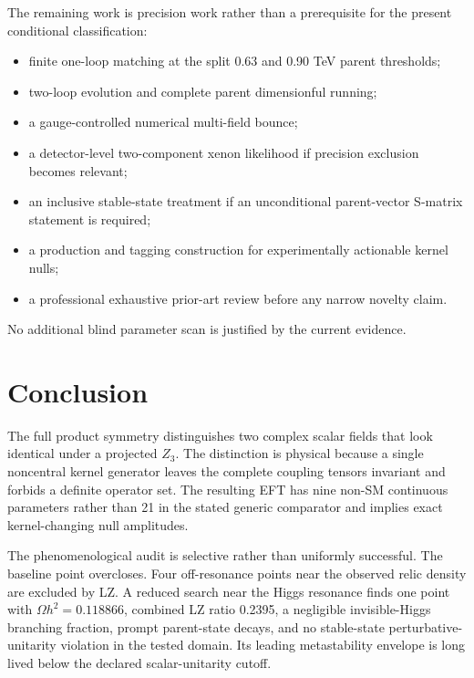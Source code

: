 \documentclass[
]{article}
\providecommand{\tightlist}{%
  \setlength{\itemsep}{0pt}\setlength{\parskip}{0pt}}
\begin{document}
The remaining work is precision work rather than a prerequisite for the
present conditional classification:

\begin{itemize}
\tightlist
\item
  finite one-loop matching at the split 0.63 and 0.90 TeV parent
  thresholds;
\item
  two-loop evolution and complete parent dimensionful running;
\item
  a gauge-controlled numerical multi-field bounce;
\item
  a detector-level two-component xenon likelihood if precision exclusion
  becomes relevant;
\item
  an inclusive stable-state treatment if an unconditional parent-vector
  S-matrix statement is required;
\item
  a production and tagging construction for experimentally actionable
  kernel nulls;
\item
  a professional exhaustive prior-art review before any narrow novelty
  claim.
\end{itemize}

No additional blind parameter scan is justified by the current evidence.

\hypertarget{conclusion}{%
\section{Conclusion}\label{conclusion}}

The full product symmetry distinguishes two complex scalar fields that
look identical under a projected \(Z_3\). The distinction is physical
because a single noncentral kernel generator leaves the complete
coupling tensors invariant and forbids a definite operator set. The
resulting EFT has nine non-SM continuous parameters rather than 21 in
the stated generic comparator and implies exact kernel-changing null
amplitudes.

The phenomenological audit is selective rather than uniformly
successful. The baseline point overcloses. Four off-resonance points
near the observed relic density are excluded by LZ. A reduced search
near the Higgs resonance finds one point with \(\Omega h^2=0.118866\),
combined LZ ratio 0.2395, a negligible invisible-Higgs branching
fraction, prompt parent-state decays, and no stable-state
perturbative-unitarity violation in the tested domain. Its leading
metastability envelope is long lived below the declared scalar-unitarity
cutoff.
\end{document}
